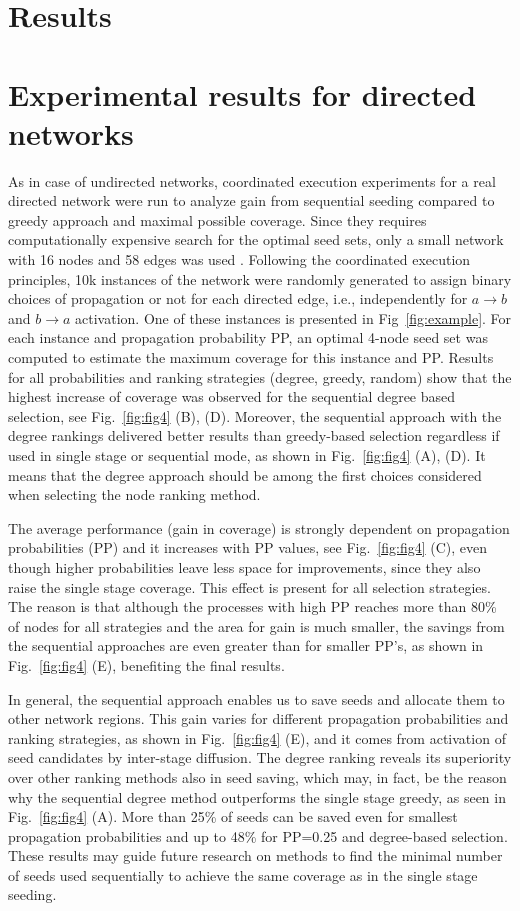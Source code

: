 \documentclass[11pt]{article} %
\begin{document}
\section*{Results}
\section*{Experimental results for directed networks}

As in case of undirected networks, coordinated execution experiments for a real directed network were run to analyze gain from sequential seeding compared to greedy approach and maximal possible coverage. Since they requires computationally expensive search for the optimal seed sets, only a small network with 16 nodes and 58 edges was used \cite{read1954cultures}. Following the coordinated execution principles, 10k instances of the network were randomly generated to assign binary choices of propagation or not for each directed edge, i.e., independently for $a \rightarrow b$ and $b \rightarrow a$ activation. One of these instances is presented in Fig~\ref{fig:example}.
For each instance and propagation probability PP, an optimal 4-node seed set was computed to estimate the maximum coverage for this instance and PP. Results for all probabilities and ranking strategies (degree, greedy, random) show that the highest increase of coverage was observed for the sequential degree based selection, see Fig.~\ref{fig:fig4} (B), (D). Moreover, the sequential approach with the degree rankings delivered better results than greedy-based selection regardless if used in single stage or sequential mode, as shown in Fig.~\ref{fig:fig4} (A), (D). It means that the degree approach should be among the first choices considered when selecting the node ranking method. 

The average performance (gain in coverage) is strongly dependent on propagation probabilities (PP) and it increases with PP values, see Fig.~\ref{fig:fig4} (C), even though higher probabilities leave less space for improvements, since they also raise the single stage coverage. This effect is present for all selection strategies. The reason is that although the processes with high PP reaches more than 80\% of nodes for all strategies and the area for gain is much smaller, the savings from the sequential approaches are even greater than for smaller PP's, as shown in Fig.~\ref{fig:fig4} (E),  benefiting the final results.

In general, the sequential approach enables us to save seeds and allocate them to other network regions. This gain varies for different propagation probabilities and ranking strategies, as shown in Fig.~\ref{fig:fig4} (E), and it comes from activation of seed candidates by inter-stage diffusion. The degree ranking reveals its superiority over other ranking methods also in seed saving, which may, in fact, be the reason why the sequential degree method outperforms the single stage greedy, as seen in Fig.~\ref{fig:fig4} (A). More than 25\% of seeds can be saved even for smallest propagation probabilities and up to 48\% for PP=0.25 and degree-based selection. These results may guide future research on methods to find the minimal number of seeds used sequentially to achieve the same coverage as in the single stage seeding. 
\end{document}

